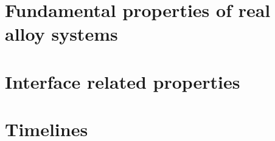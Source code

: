\section{Fundamental properties of real alloy systems}

\section{Interface related properties}

\section{Timelines}